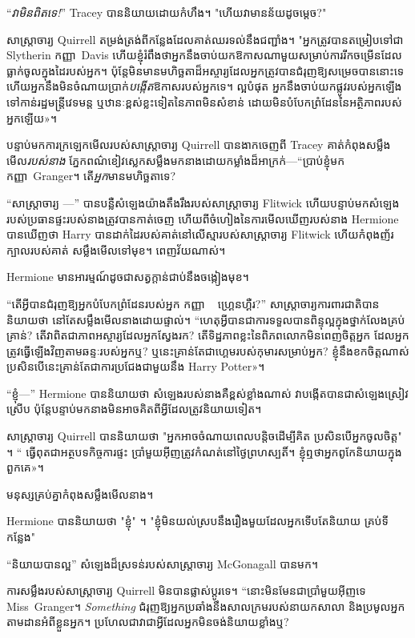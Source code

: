 “\emph{វាមិនពិតទេ!}” Tracey បាននិយាយដោយកំហឹង។ "ហើយវាមានន័យដូចម្តេច?"

សាស្ត្រាចារ្យ Quirrell តម្រង់ត្រង់ពីកន្លែងដែលគាត់ឈរទល់នឹងជញ្ជាំង។ "អ្នកត្រូវបានតម្រៀបទៅជា Slytherin កញ្ញា~Davis ហើយខ្ញុំរំពឹងថាអ្នកនឹងចាប់យកឱកាសណាមួយសម្រាប់ការរីកចម្រើនដែលធ្លាក់ចូលក្នុងដៃរបស់អ្នក។ ប៉ុន្តែមិនមានមហិច្ឆតាដ៏អស្ចារ្យដែលអ្នកត្រូវបានជំរុញឱ្យសម្រេចបាននោះទេ ហើយអ្នកនឹងមិនចំណាយប្រាក់\emph{បង្កើត}ឱកាសរបស់អ្នកទេ។ ល្អបំផុត អ្នកនឹងចាប់យកផ្លូវរបស់អ្នកឡើងទៅកាន់រដ្ឋមន្ត្រីវេទមន្ត ឬឋានៈខ្ពស់ខ្លះទៀតនៃភាពមិនសំខាន់ ដោយមិនបំបែកព្រំដែននៃអត្ថិភាពរបស់អ្នកឡើយ»។

បន្ទាប់មកការក្រឡេកមើលរបស់សាស្រ្តាចារ្យ Quirrell បានងាកចេញពី Tracey គាត់កំពុងសម្លឹងមើល\emph{របស់នាង} ភ្នែកពណ៌ខៀវស្លេកសម្លឹងមកនាងដោយកម្លាំងដ៏អាក្រក់—“ប្រាប់ខ្ញុំមក កញ្ញា~Granger។ តើ\emph{អ្នក}មានមហិច្ឆតាទេ?

“សាស្រ្តាចារ្យ —” បានបន្លឺសំឡេងយ៉ាងតឹងរឹងរបស់សាស្រ្តាចារ្យ Flitwick ហើយបន្ទាប់មកសំឡេងរបស់ប្រធានផ្ទះរបស់នាងត្រូវបានកាត់ចេញ ហើយពីចំហៀងនៃការមើលឃើញរបស់នាង Hermione បានឃើញថា Harry បានដាក់ដៃរបស់គាត់នៅលើស្មារបស់សាស្រ្តាចារ្យ Flitwick ហើយកំពុងញ័រក្បាលរបស់គាត់ សម្លឹងមើលទៅមុខ។ ពេញវ័យណាស់។

Hermione មានអារម្មណ៍ដូចជាសត្វក្តាន់ជាប់នឹងចង្កៀងមុខ។

“តើ​អ្វី​បាន​ជំរុញ​ឱ្យ​អ្នក​បំបែក​ព្រំ​ដែន​របស់​អ្នក កញ្ញា ~ ហ្គ្រេនហ្គឺរ?” សាស្ត្រាចារ្យការពារជាតិបាននិយាយថា នៅតែសម្លឹងមើលនាងដោយផ្ទាល់។ “ហេតុអ្វីបានជាការទទួលបានពិន្ទុល្អក្នុងថ្នាក់លែងគ្រប់គ្រាន់? តើ​វា​ពិត​ជា​ភាព​អស្ចារ្យ​ដែល​អ្នក​ស្វែង​រក? តើ​ទិដ្ឋភាព​ខ្លះ​នៃ​ពិភពលោក​មិន​ពេញ​ចិត្ត​អ្នក ដែល​អ្នក​ត្រូវ​ធ្វើ​ឡើង​វិញ​តាម​ឆន្ទៈ​របស់​អ្នក​ឬ? ឬនេះគ្រាន់តែជាហ្គេមរបស់កុមារសម្រាប់អ្នក? ខ្ញុំ​នឹង​ខក​ចិត្ត​ណាស់​ប្រសិន​បើ​នេះ​គ្រាន់​តែ​ជា​ការ​ប្រជែង​ជាមួយ​នឹង Harry Potter»។

“ខ្ញុំ—” Hermione បាននិយាយថា សំឡេងរបស់នាងគឺខ្ពស់ខ្លាំងណាស់ វាបង្កើតបានជាសំឡេងស្រៀវស្រើប ប៉ុន្តែបន្ទាប់មកនាងមិនអាចគិតពីអ្វីដែលត្រូវនិយាយទៀត។

សាស្រ្តាចារ្យ Quirrell បាននិយាយថា "អ្នកអាចចំណាយពេលបន្តិចដើម្បីគិត ប្រសិនបើអ្នកចូលចិត្ត" ។ “ ធ្វើពុតជាអត្ថបទកិច្ចការផ្ទះ ប្រាំមួយអ៊ីញត្រូវកំណត់នៅថ្ងៃព្រហស្បតិ៍។ ខ្ញុំ​ឮ​ថា​អ្នក​ពូកែ​និយាយ​ក្នុង​ពួក​គេ»។

មនុស្សគ្រប់គ្នាកំពុងសម្លឹងមើលនាង។

Hermione បាននិយាយថា "ខ្ញុំ" ។ "ខ្ញុំមិនយល់ស្របនឹងរឿងមួយដែលអ្នកទើបតែនិយាយ គ្រប់ទីកន្លែង"

“និយាយបានល្អ” សំឡេងដ៏ស្រទន់របស់សាស្រ្តាចារ្យ McGonagall បានមក។

ការសម្លឹងរបស់សាស្រ្តាចារ្យ Quirrell មិនបានផ្លាស់ប្តូរទេ។ “នោះមិនមែនជាប្រាំមួយអ៊ីញទេ Miss~Granger។ \emph{Something} ជំរុញឱ្យអ្នកប្រឆាំងនឹងសាលក្រមរបស់នាយកសាលា និងប្រមូលអ្នកតាមដានអំពីខ្លួនអ្នក។ ប្រហែល​ជា​វា​ជា​អ្វី​ដែល​អ្នក​មិន​ចង់​និយាយ​ខ្លាំង​ឬ?

